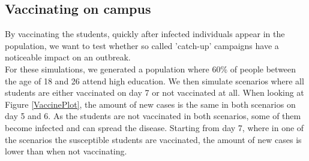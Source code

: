 \documentclass[runningheads]{llncs}
\begin{document}
\subsection{Vaccinating on campus}
By vaccinating the students, quickly after infected individuals appear in the population, we want to test whether so called 'catch-up' campaigns have a noticeable impact on an outbreak. \\
For these simulations, we generated a population where 60\% of people between the age of 18 and 26 attend high education. We then simulate scenarios where all students are either vaccinated on day 7 or not vaccinated at all. When looking at Figure \ref{VaccinePlot}, the amount of new cases is the same in both scenarios on day 5 and 6. As the students are not vaccinated in both scenarios, some of them become infected and can spread the disease. Starting from day 7, where in one of the scenarios the susceptible students are vaccinated, the amount of new cases is lower than when not vaccinating.
\end{document}
